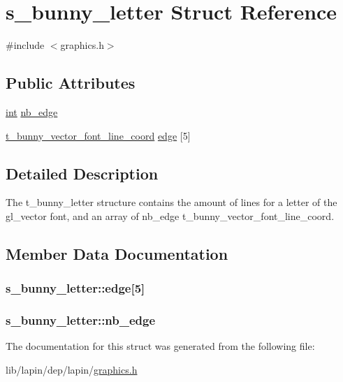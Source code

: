 \hypertarget{structs__bunny__letter}{\section{s\-\_\-bunny\-\_\-letter Struct Reference}
\label{structs__bunny__letter}
}


{\ttfamily \#include $<$graphics.\-h$>$}

\subsection*{Public Attributes}
\begin{DoxyCompactItemize}
\item 
\hyperlink{term__entry_8h_ad65b480f8c8270356b45a9890f6499ae}{int} \hyperlink{structs__bunny__letter_a8a7a93a24bb5839cbeb744c3c3b7f153}{nb\-\_\-edge}
\item 
\hyperlink{graphics_8h_ac19938f2a1d45203f2c767d7e849789a}{t\-\_\-bunny\-\_\-vector\-\_\-font\-\_\-line\-\_\-coord} \hyperlink{structs__bunny__letter_a8c461d0b7b493d7179c50a1ef8c19e47}{edge} \mbox{[}5\mbox{]}
\end{DoxyCompactItemize}


\subsection{Detailed Description}
The t\-\_\-bunny\-\_\-letter structure contains the amount of lines for a letter of the gl\-\_\-vector font, and an array of nb\-\_\-edge t\-\_\-bunny\-\_\-vector\-\_\-font\-\_\-line\-\_\-coord. 

\subsection{Member Data Documentation}
\hypertarget{structs__bunny__letter_a8c461d0b7b493d7179c50a1ef8c19e47}{
\subsubsection[{edge}]{ s\-\_\-bunny\-\_\-letter\-::edge\mbox{[}5\mbox{]}}}\label{structs__bunny__letter_a8c461d0b7b493d7179c50a1ef8c19e47}
\hypertarget{structs__bunny__letter_a8a7a93a24bb5839cbeb744c3c3b7f153}{
\subsubsection[{nb\-\_\-edge}]{ s\-\_\-bunny\-\_\-letter\-::nb\-\_\-edge}}\label{structs__bunny__letter_a8a7a93a24bb5839cbeb744c3c3b7f153}


The documentation for this struct was generated from the following file\-:\begin{DoxyCompactItemize}
\item 
lib/lapin/dep/lapin/\hyperlink{graphics_8h}{graphics.\-h}\end{DoxyCompactItemize}
